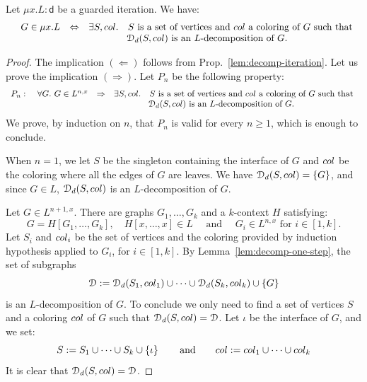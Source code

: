 \begin{example}
\end{example}

\begin{proposition}\label{prop:decomp-iteration-dom} Let  $\mu x. L:\mathsf{d}$ be a guarded iteration. We have:
$$\begin{array}{rll}
 \quad G\in \mu x. L& \Leftrightarrow& \exists S, \col.\quad  S \text{ is a set of vertices and $\col$ a coloring of $G$ such that }\\
                      &             & \qquad\qquad \cD_\mathsf{d}(S,\col) \text{ is an $L$-decomposition of $G$.} 
\end{array}
$$
\end{proposition}

\begin{proof} 
The implication $(\Leftarrow)$ follows from Prop.~\ref{lem:decomp-iteration}. Let us prove the implication $(\Rightarrow)$.  Let $P_n$ be the following property:
$$\begin{array}{lrll}
P_n:&\ \forall G.\  G\in L^{n,x}& \Rightarrow& \exists S, \col.\quad  S \text{ is a set of vertices and $\col$ a coloring of $G$ such that }\\
 &                      &             & \qquad\qquad \cD_\mathsf{d}(S,\col) \text{ is an $L$-decomposition of $G$.} 
\end{array}
$$
We prove, by induction on $n$, that $P_n$ is valid for every $n\geq 1$, which  is enough to conclude. 
\medskip

 When $n=1$, we let $S$ be the singleton containing the interface of $G$ and  $\col$ be the coloring where all the edges of $G$ are leaves. We have $\cD_\mathsf{d}(S,\col)=\set{G}$, and since $G\in L$,   $\cD_\mathsf{d}(S,\col)$ is an $L$-decomposition of $G$.
\medskip

 Let $G\in L^{n+1,x}$. There are graphs $G_1, \dots, G_k$ and a $k$-context $H$ satisfying:
 $$G=H[G_1,\dots, G_k], \quad H[x,\dots,x]\in L\quad \text{ and }\quad  G_i\in L^{n,x} \text{ for } i\in[1,k].$$
 Let $S_i$ and $\col_i$ be the set of vertices and the coloring provided by induction hypothesis applied to $G_i$, for $i\in[1,k]$. 
 By Lemma~\ref{lem:decomp-one-step}, the set of subgraphs
 $$\cD:=\cD_\mathsf{d}(S_1,\col_1)\cup\dots\cup\cD_\mathsf{d}(S_k,\col_k)\cup\set{G}$$
 is an $L$-decomposition of $G$. To conclude we only need to find a set of vertices $S$ and a coloring $\col$ of $G$ such that $\cD_\mathsf{d}(S,\col)=\cD$. Let $\iota$ be the interface of $G$, and we set:
    $$S:=S_1\cup\dots\cup S_k\cup\set{\iota} \qquad\text{and}\qquad \col:=\col_1\cup\dots\cup \col_k$$
It is clear that $\cD_\mathsf{d}(S,\col)=\cD$.
\end{proof}

